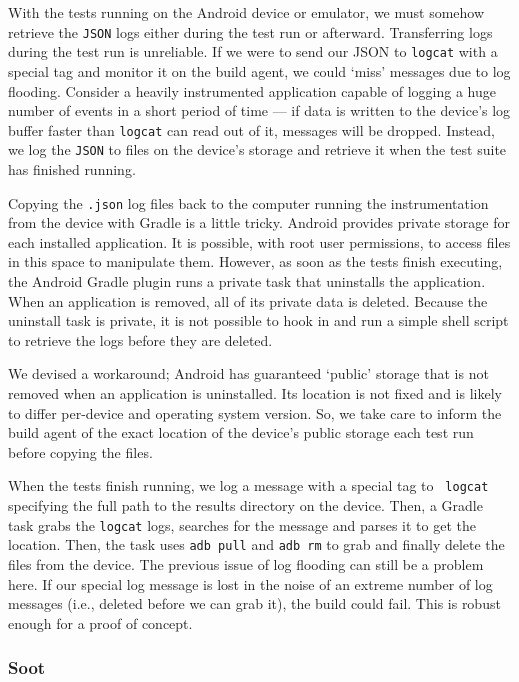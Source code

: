 With the tests running on the Android device or emulator, we must somehow
retrieve the {\tt JSON} logs either during the test run or afterward.
Transferring logs during the test run is unreliable. If we were to send our JSON
to {\tt logcat} with a special tag and monitor it on the build agent, we could
{\lq}miss{\rq} messages due to log flooding. Consider a heavily instrumented
application capable of logging a huge number of events in a short period of time
--- if data is written to the device's log buffer faster than {\tt logcat} can
read out of it, messages will be dropped. Instead, we log the {\tt JSON} to
files on the device's storage and retrieve it when the test suite has finished
running.

Copying the {\tt .json} log files back to the computer running the
instrumentation from the device with Gradle is a little tricky. Android provides
private storage for each installed application. It is possible, with root user
permissions, to access files in this space to manipulate them. However, as soon
as the tests finish executing, the Android Gradle plugin runs a private task
that uninstalls the application. When an application is removed, all of its
private data is deleted. Because the uninstall task is private, it is not
possible to hook in and run a simple shell script to retrieve the logs before
they are deleted.

We devised a workaround; Android has guaranteed {\lq}public{\rq} storage that is
not removed when an application is uninstalled. Its location is not fixed and is
likely to differ per-device and operating system version. So, we take care to
inform the build agent of the exact location of the device's public storage each
test run before copying the files.

When the tests finish running, we log a message with a special tag to {\tt
logcat} specifying the full path to the results directory on the device. Then, a
Gradle task grabs the {\tt logcat} logs, searches for the message and parses it
to get the location. Then, the task uses {\tt adb pull} and {\tt adb rm} to grab
and finally delete the files from the device. The previous issue of log flooding
can still be a problem here. If our special log message is lost in the noise of
an extreme number of log messages (i.e., deleted before we can grab it), the
build could fail. This is robust enough for a proof of concept.

\subsubsection{Soot}

